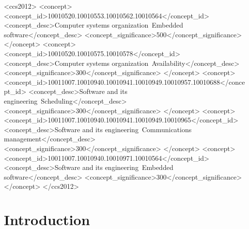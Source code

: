 \documentclass[acmsmall,review,anonymous]{acmart}\settopmatter{printfolios=true,printccs=false,printacmref=false}
\begin{document}
\renewcommand{\shortauthors}{A. Y. Majid et al.}

\begin{abstract}
	


\end{abstract}


\begin{CCSXML}
	<ccs2012>
	<concept>
	<concept_id>10010520.10010553.10010562.10010564</concept_id>
	<concept_desc>Computer systems organization~Embedded 
	software</concept_desc>
	<concept_significance>500</concept_significance>
	</concept>
	<concept>
	<concept_id>10010520.10010575.10010578</concept_id>
	<concept_desc>Computer systems organization~Availability</concept_desc>
	<concept_significance>300</concept_significance>
	</concept>
	<concept>
	<concept_id>10011007.10010940.10010941.10010949.10010957.10010688</concept_id>
	<concept_desc>Software and its engineering~Scheduling</concept_desc>
	<concept_significance>300</concept_significance>
	</concept>
	<concept>
	<concept_id>10011007.10010940.10010941.10010949.10010965</concept_id>
	<concept_desc>Software and its engineering~Communications 
	management</concept_desc>
	<concept_significance>300</concept_significance>
	</concept>
	<concept>
	<concept_id>10011007.10010940.10010971.10010564</concept_id>
	<concept_desc>Software and its engineering~Embedded 
	software</concept_desc>
	<concept_significance>300</concept_significance>
	</concept>
	</ccs2012>
\end{CCSXML}

%

\maketitle

\section{Introduction}
\label{sec:intro}
\end{document}
